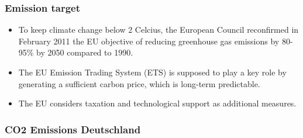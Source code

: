 \begin{frame}
\frametitle{Emission target}
\begin{itemize}
\item<1-> To keep climate change below 2 Celcius, the European Council reconfirmed in February
2011 the EU objective of reducing greenhouse gas emissions by 80-95\% by 2050 compared to
1990.
\item<2-> The EU Emission Trading System (ETS) is supposed to play a key role by generating a sufficient carbon price,
which is long-term predictable.
\item<3-> The EU  considers taxation and technological support as additional measures.
\end{itemize}
\end{frame}


\begin{frame}\frametitle{CO2 Emissions Deutschland}
\begin{center}
\begin{figure}[h!]
\centering
{}
\label{fig:abatement}
\end{figure}
\end{center}
\end{frame}



